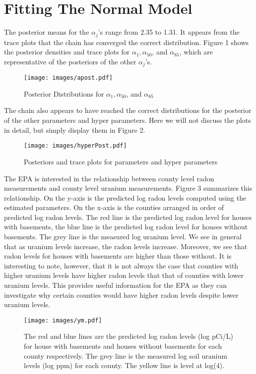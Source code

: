 \documentclass{article}
\def\beginmyfig{\begin{figure}[htbp]\begin{center}}
\def\endmyfig{\end{center}\end{figure}}
\begin{document}
\section{Fitting The Normal Model}
The posterior means for the $\alpha_j$'s range from 2.35 to 1.31. It appears from the trace
plots that the chain has converged the correct distribution. Figure 1 shows the posterior
densities and trace plots for $\alpha_1,\alpha_{50}$, and $\alpha_{85}$, which are representative
of the posteriors of the other $\alpha_j$'s.\\
\beginmyfig \texttt{[image: images/apost.pdf]} 
            \caption{Posterior Distributions for $\alpha_1,\alpha_{50}$, and $\alpha_{85}$} \endmyfig 
\noindent
The chain also appears to have reached the correct distributions for the posterior of the other parameters
and hyper parameters. Here we will not discuss the plots in detail, but simply display them in Figure 2.\\
\beginmyfig \texttt{[image: images/hyperPost.pdf]} 
            \caption{Posteriors and trace plots for parameters and hyper parameters}\endmyfig 
\noindent
The EPA is interested in the relationship between county level radon
measurements and county level uranium measurements. Figure 3 summarizes this
relationship. On the y-axis is the predicted log radon levels computed using
the estimated parameters. On the x-axis is the counties arranged in order of
predicted log radon levels. The red line is the predicted log radon level
for houses with basements, the blue line is the predicted log radon level
for houses without basements. The grey line is the measured log uranium level.
We see in general that as uranium levels increase, the radon levels increase. 
Moreover, we see that radon levels for houses with basements are higher than
those without. It is interesting to note, however, that it is not always the
case that counties with higher uranium levels have higher radon levels that
that of counties with lower uranium levels. This provides useful information
for the EPA as they can investigate why certain counties would have higher 
radon levels despite lower uranium levels.\\

\beginmyfig \texttt{[image: images/ym.pdf]}  
            \caption{The red and blue lines are the predicted log radon levels
            (log pCi/L) for house with basements and houses without basements
            for each county respectively. The grey line is the measured log
            soil uranium levels (log ppm) for each county. The yellow line
            is level at log(4).}\endmyfig 
\end{document}
